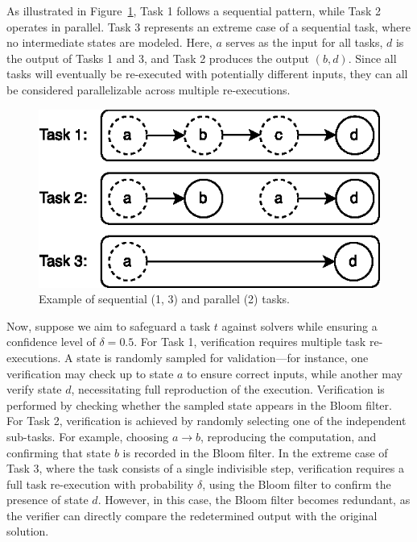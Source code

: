 \documentclass[sigconf, nonacm]{acmart}
\begin{document}
As illustrated in Figure~\ref{fig:task12}, Task 1 follows a sequential pattern, while Task 2 operates in parallel. Task 3 represents an extreme case of a sequential task, where no intermediate states are modeled. Here, $a$ serves as the input for all tasks, $d$ is the output of Tasks 1 and 3, and Task 2 produces the output $ (b, d)$. Since all tasks will eventually be re-executed with potentially different inputs, they can all be considered parallelizable across multiple re-executions.

\begin{figure}[tb]
  \begin{center}
    \includegraphics[width=.8\columnwidth]{figs/diagram-tasks.svg.eps}
    \caption{Example of sequential (1, 3) and parallel (2) tasks.}
    \label{fig:task12}
  \end{center}
\end{figure}

Now, suppose we aim to safeguard a task $t$ against  solvers while ensuring a confidence level of $\delta = 0.5$.
For Task 1, verification requires multiple task re-executions. A state is randomly sampled for validation—for instance, one verification may check up to state $a$ to ensure correct inputs, while another may verify state $d$, necessitating full reproduction of the execution. Verification is performed by checking whether the sampled state appears in the Bloom filter.
For Task 2, verification is achieved by randomly selecting one of the independent sub-tasks. For example, choosing $a \rightarrow b$, reproducing the computation, and confirming that state $b$ is recorded in the Bloom filter.
In the extreme case of Task 3, where the task consists of a single indivisible step, verification requires a full task re-execution with probability $\delta$, using the Bloom filter to confirm the presence of state $d$. However, in this case, the Bloom filter becomes redundant, as the verifier can directly compare the redetermined output with the original solution.
\end{document}
